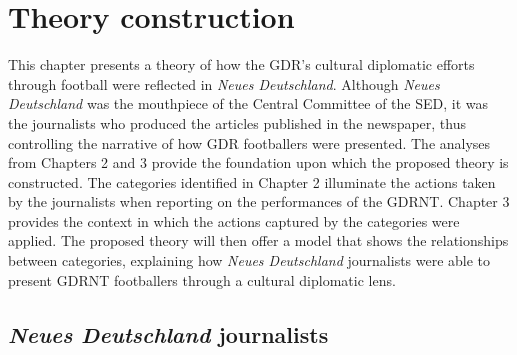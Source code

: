 \chapter{Theory construction\label{cha:theory}}

This chapter presents a theory of how the GDR’s cultural diplomatic efforts through football were reflected in \textit{Neues Deutschland}. Although \textit{Neues Deutschland} was the mouthpiece of the Central Committee of the SED, it was the journalists who produced the articles published in the newspaper, thus controlling the narrative of how GDR footballers were presented.   The analyses from Chapters 2 and 3 provide the foundation upon which the proposed theory is constructed. The categories identified in Chapter 2 illuminate the actions taken by the journalists when reporting on the performances of the GDRNT. Chapter 3 provides the context in which the actions captured by the categories were applied. The proposed theory will then offer a model that shows the relationships between categories, explaining how \textit{Neues Deutschland} journalists were able to present GDRNT footballers through a cultural diplomatic lens.

\section*{\textit{Neues Deutschland} journalists}

